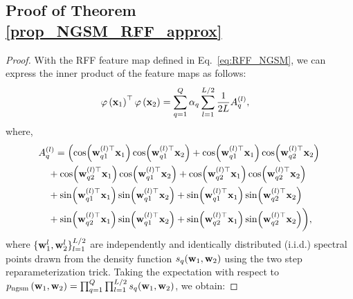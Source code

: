 





\subsection{Proof of Theorem \ref{prop_NGSM_RFF_approx}}
\label{app:proof_theorem_3}
\begin{proof}
With the RFF feature map defined in Eq.~\eqref{eq:RFF_NGSM}, we can express the inner product of the feature maps as follows:
\begin{equation}
\begin{aligned}
&\varphi \left( {\mathbf x}_1 \right)^\top \varphi \left( {\mathbf x}_2 \right) = \sum_{q=1}^Q \alpha_q \sum_{l=1}^{L/2} \frac{1}{2 L}A_{q}^{(l)},
\end{aligned}
\end{equation}
where,
\begin{equation}
\begin{aligned}
& A_{q}^{(l)} = \left( \cos({\mathbf w}_{q1}^{(l)\top} {\mathbf x}_1) \cos({\mathbf w}_{q1}^{(l)\top} {\mathbf x}_2) + \cos({\mathbf w}_{q1}^{(l)\top} {\mathbf x}_1) \cos({\mathbf w}_{q2}^{(l)\top} {\mathbf x}_2) \right.\\
&\quad + \cos({\mathbf w}_{q2}^{(l)\top} {\mathbf x}_1) \cos({\mathbf w}_{q1}^{(l)\top} {\mathbf x}_2) + \cos({\mathbf w}_{q2}^{(l)\top} {\mathbf x}_1) \cos({\mathbf w}_{q2}^{(l)\top} {\mathbf x}_2) \\
&\quad + \sin({\mathbf w}_{q1}^{(l)\top} {\mathbf x}_1) \sin({\mathbf w}_{q1}^{(l)\top} {\mathbf x}_2) + \sin({\mathbf w}_{q1}^{(l)\top} {\mathbf x}_1) \sin({\mathbf w}_{q2}^{(l)\top} {\mathbf x}_2) \\
&\quad + \sin({\mathbf w}_{q2}^{(l)\top} {\mathbf x}_1) \sin({\mathbf w}_{q1}^{(l)\top} {\mathbf x}_2) + \sin({\mathbf w}_{q2}^{(l)\top} {\mathbf x}_1) \sin({\mathbf w}_{q2}^{(l)\top} {\mathbf x}_2) \bigg),
\end{aligned}
\end{equation}
where \(\{\mathbf{{\mathbf w}}_1^l,\mathbf{{\mathbf w}}_2^l\}_{l=1}^{L/2}\) are independently and identically distributed (i.i.d.) spectral points drawn from the density function \(s_q(\mathbf{{\mathbf w}}_1, \mathbf{{\mathbf w}}_2)\) using the two step reparameterization trick. Taking the expectation with respect to \( p_{\text{ngsm}}\left(\mathbf{{\mathbf w}}_1, \mathbf{{\mathbf w}}_2\right) = \prod_{q=1}^Q \prod_{l=1}^{L/2} s_q(\mathbf{{\mathbf w}}_1, \mathbf{{\mathbf w}}_2) \), we obtain:

\end{proof}
